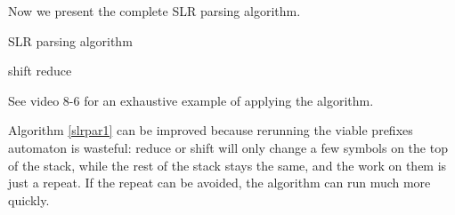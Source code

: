 Now we present the complete SLR parsing algorithm.
\begin{algorithm}[ht]
\caption{SLR parsing algorithm}\label{slrpar1}
\begin{algorithmic}
\Repeat
	\Else 
		 shift
		 reduce
		 \EndIf
	\EndIf
{}
\end{algorithmic}
\end{algorithm}

See video 8-6 for an exhaustive example of applying the algorithm.

Algorithm \eqref{slrpar1} can be improved because rerunning the viable prefixes automaton is wasteful: reduce or shift will only change a few symbols on the top of the stack, while the rest of the stack stays the same, and the work on them is just a repeat. If the repeat can be avoided, the algorithm can run much more quickly. 

